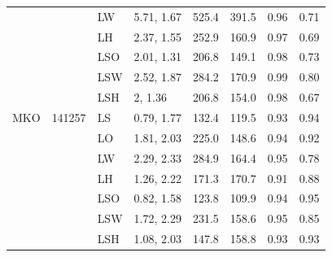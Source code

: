 \begin{table}
\begin{tabular}[t]{llllrrrr}
 &  & LW & 5.71, 1.67 & 525.4 & 391.5 & 0.96 & 0.71\\
 &  & LH & 2.37, 1.55 & 252.9 & 160.9 & 0.97 & 0.69\\
 &  & LSO & 2.01, 1.31 & 206.8 & 149.1 & 0.98 & 0.73\\
 &  & LSW & 2.52, 1.87 & 284.2 & 170.9 & 0.99 & 0.80\\
 &  & LSH & 2, 1.36 & 206.8 & 154.0 & 0.98 & 0.67\\
\addlinespace
MKO & 141257 & LS & 0.79, 1.77 & 132.4 & 119.5 & 0.93 & 0.94\\
 &  & LO & 1.81, 2.03 & 225.0 & 148.6 & 0.94 & 0.92\\
 &  & LW & 2.29, 2.33 & 284.9 & 164.4 & 0.95 & 0.78\\
 &  & LH & 1.26, 2.22 & 171.3 & 170.7 & 0.91 & 0.88\\
 &  & LSO & 0.82, 1.58 & 123.8 & 109.9 & 0.94 & 0.95\\
 &  & LSW & 1.72, 2.29 & 231.5 & 158.6 & 0.95 & 0.85\\
 &  & LSH & 1.08, 2.03 & 147.8 & 158.8 & 0.93 & 0.93\\
\bottomrule
\end{tabular}
\end{table}

